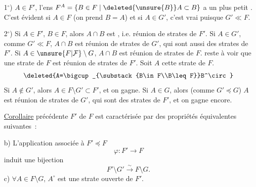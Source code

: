 1$^\circ$)  $A\in F'$, l'ens $F^A=\{B\in F\mid \deleted{\unsure{B}}A\subset B\}$ a un plus petit . C'est évident si $A\in F$  (on prend $B=A$) et si $A\in G'$, c'est vrai puisque $G'\ll F$.

2$^\circ$) Si $A\in F'$, $B\in F$, alors $A\cap B$ est , i.e. réunion de strates de $F'$. Si $A\in G'$, comme $G'\ll F$, $A\cap B$ est réunion de strates de $G'$, qui sont aussi des strates de $F'$.
Si $A\in \unsure{F|\mathcal F}\setminus G$, $A\cap B$ est réunion de strates de $F$.  reste à voir que une strate  de $F$ est réunion de strates de $F'$. Soit $A$ cette strate de $F$. 
\[
 \deleted{A=\bigcup_{\substack{B\in F\\B\leq F}}B^\circ}
\]
Si $A\notin G'$, alors $A\in F\setminus G'\subset F'$, et on gagne. Si $A\in G$, alors (comme $G'\preceq G$) $A$ est réunion de strates de $G'$, qui sont des strates de $F'$, et on gagne encore.

\uline{Corollaire}   précédente $F'$ de $F$ est caractérisée par  des propriétés équivalentes suivantes~:

b) L'application  associée à $F'\preceq F$
\[
 \varphi:F'\longrightarrow F
\]
induit une bijection
\[
 F'\setminus G'\xrightarrow{\sim}F\setminus G.
\]
c)  $\forall A\in F\setminus G$, $A^\circ$ est une strate ouverte de $F'$.

